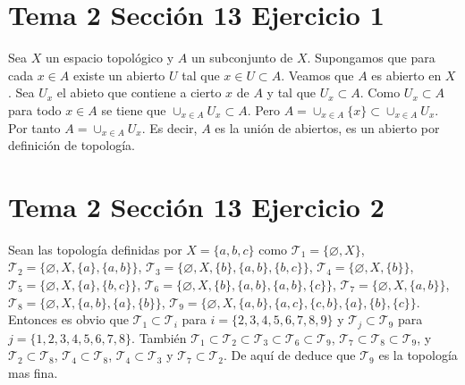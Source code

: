 \documentclass{article}
\begin{document}
\section{Tema 2 Sección 13 Ejercicio 1}
Sea $X$ un espacio topológico y $A$ un subconjunto de $X$. Supongamos que para cada $x\in A$ existe un abierto $U$ tal que $x\in U\subset A$. Veamos que $A$ es abierto en $X$. Sea $U_x$ el abieto que contiene a cierto $x$ de $A$ y tal que $U_x\subset A$. Como $U_x\subset A$ para todo $x\in A$ se tiene que $ \cup_{x\in A} U_x\subset A$. Pero  $A=\cup_{x\in A}\{x\}\subset \cup_{x\in A}U_x$. Por tanto $A=\cup_{x\in A}U_{x}$. Es decir, $A$ es la unión de abiertos, es un abierto por definición de topología.
\section{Tema 2 Sección 13 Ejercicio 2}
Sean las topología definidas por $X=\{a,b,c\}$ como $\mathcal{T}_1=\{\varnothing,X\}$, $\mathcal{T}_2=\{\varnothing,X,\{a\},\{a,b\}\}$, $\mathcal{T}_3=\{\varnothing,X,\{b\},\{a,b\},\{b,c\}\}$, $\mathcal{T}_4=\{\varnothing,X,\{b\}\}$, $\mathcal{T}_5=\{\varnothing,X,\{a\},\{b,c\}\}$, $\mathcal{T}_6=\{\varnothing,X,\{b\},\{a,b\},\{a,b\},\{c\}\}$, $\mathcal{T}_7=\{\varnothing,X,\{a,b\}\}$, $\mathcal{T}_8=\{\varnothing,X,\{a,b\},\{a\},\{b\}\}$, $\mathcal{T}_9=\{\varnothing,X,\{a,b\},\{a,c\},\{c,b\},\{a\},\{b\},\{c\}\}$. Entonces es obvio que $\mathcal{T}_1\subset \mathcal{T}_i$ para $i=\{2,3,4,5,6,7,8,9\}$ y $\mathcal{T}_j\subset \mathcal{T}_9$ para $j=\{1,2,3,4,5,6,7,8\}$. También $\mathcal{T}_1\subset \mathcal{T}_2\subset \mathcal{T}_3\subset \mathcal{T}_6 \subset \mathcal{T}_9$, $\mathcal{T}_7\subset \mathcal{T}_8 \subset \mathcal{T}_9$, y $\mathcal{T}_2\subset \mathcal{T}_8 $, $\mathcal{T}_4\subset \mathcal{T}_8 $, $\mathcal{T}_4\subset \mathcal{T}_3 $ y $\mathcal{T}_7\subset \mathcal{T}_2$. De aquí de deduce que $\mathcal{T}_{9}$ es la topología mas fina.
\end{document}
